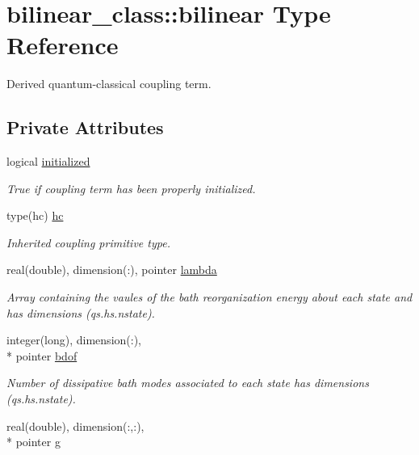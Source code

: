 \hypertarget{structbilinear__class_1_1bilinear}{\section{bilinear\-\_\-class\-:\-:bilinear Type Reference}
\label{structbilinear__class_1_1bilinear}
}


Derived quantum-\/classical coupling term.  


\subsection*{Private Attributes}
\begin{DoxyCompactItemize}
\item 
logical \hyperlink{structbilinear__class_1_1bilinear_a97bca767cbc1ecae9489db5950da06bc}{initialized}
\begin{DoxyCompactList}\small\item\em True if coupling term has been properly initialized. \end{DoxyCompactList}\item 
type(hc) \hyperlink{structbilinear__class_1_1bilinear_aeb9f98e320b690f4bfef83caf407dfaa}{hc}
\begin{DoxyCompactList}\small\item\em Inherited coupling primitive type. \end{DoxyCompactList}\item 
real(double), dimension(\-:), pointer \hyperlink{structbilinear__class_1_1bilinear_aabd615d49d52220aac52707b2e2b1aa6}{lambda}
\begin{DoxyCompactList}\small\item\em Array containing the vaules of the bath reorganization energy about each state and has dimensions (qs.\-hs.\-nstate). \end{DoxyCompactList}\item 
integer(long), dimension(\-:), \\*
pointer \hyperlink{structbilinear__class_1_1bilinear_a78e65d82cd358d5dfa19b780ab877fa0}{bdof}
\begin{DoxyCompactList}\small\item\em Number of dissipative bath modes associated to each state has dimensions (qs.\-hs.\-nstate). \end{DoxyCompactList}\item 
real(double), dimension(\-:,\-:), \\*
pointer \hyperlink{structbilinear__class_1_1bilinear_a910401429e7649dba49acbab872a1b75}{g}

\end{DoxyCompactItemize}
